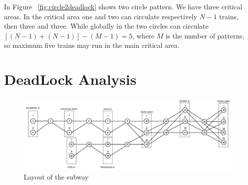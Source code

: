 \documentclass{ewic}
\begin{document}
			
			In Figure ~\ref{fig:circle2deadlock} shows two circle pattern. We have three critical areas. In the critical area one and two can circulate respectively $N-1$ trains, then three and three. While globally in the two circles can circulate $[(N-1) + (N-1)] - (M-1)=5$, where $M$ is the number of patterns, so maximum five trains may run in the main critical area.
			
		
			
			\section{DeadLock Analysis}
			
			\begin{figure}[htbp]
				\begin{centering}	
				\includegraphics[scale=0.45]{img/esempioG}
				\caption{Layout of the subway}
				\label{fig:example}
				\end{centering}
			\end{figure}
			
\end{document}
